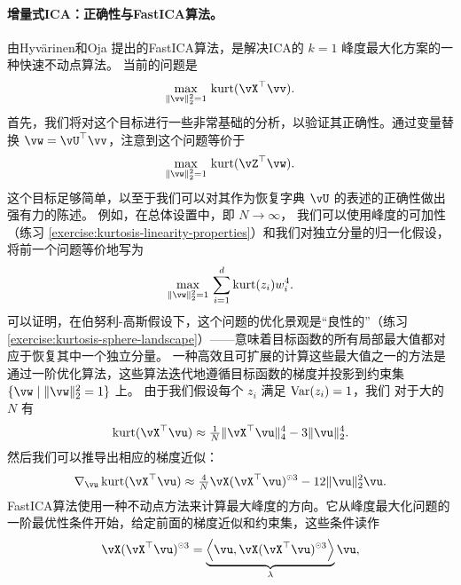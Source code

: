 \documentclass[../../book-main_zh.tex]{subfiles}
\begin{document}
\paragraph{增量式ICA：正确性与FastICA算法。}
由Hyv\"{a}rinen和Oja \cite{hyvarinen-1997} 提出的FastICA算法，是解决ICA的 $k=1$ 峰度最大化方案的一种快速不动点算法。
当前的问题是
\begin{equation}\label{eq:kurtosis-maximization-sphere-finitesample}
    \max_{\norm{\vv}_2^2 = 1}\, \kurt(\vX^\top \vv).
\end{equation}
首先，我们将对这个目标进行一些非常基础的分析，以验证其正确性。通过变量替换 $\vw = \vU^\top \vv$，注意到这个问题等价于
\begin{equation*}
    \max_{\norm{\vw}_2^2 = 1}\, 
    \mathrm{kurt}(\vZ^\top \vw).
\end{equation*}
这个目标足够简单，以至于我们可以对其作为恢复字典 $\vU$ 的表述的正确性做出强有力的陈述。
例如，在总体设置中，即 $N \to \infty$，
我们可以使用峰度的可加性（练习 \ref{exercise:kurtosis-linearity-properties}）和我们对独立分量的归一化假设，将前一个问题等价地写为
\begin{equation}\label{eq:kurtosis-maximization-sphere-population-simple}
    \max_{\norm{\vw}_2^2 = 1}\, 
    \sum_{i=1}^d \mathrm{kurt}(z_i) w_i^4.
\end{equation}
可以证明，在伯努利-高斯假设下，这个问题的优化景观是“良性的”（练习 \ref{exercise:kurtosis-sphere-landscape}）——意味着目标函数的所有局部最大值都对应于恢复其中一个独立分量。
一种高效且可扩展的计算这些最大值之一的方法是通过一阶优化算法，这些算法迭代地遵循目标函数的梯度并投影到约束集 $\set{\vw \given \norm{\vw}_2^2 = 1}$ 上。
由于我们假设每个 $z_i$ 满足 $\operatorname{Var}(z_i)=1$，我们
对于大的 $N$ 有
\begin{equation}\label{eq:kurtosis-approximation-l4}
    \kurt(\vX^\top \vu)
    \approx
    \tfrac{1}{N} \norm{\vX^\top \vu}_4^4 - 3 \norm{\vu}_2^4.
\end{equation}
然后我们可以推导出相应的梯度近似：
\begin{equation*}
    \nabla_{\vu} \kurt(\vX^\top \vu)
    \approx
    \tfrac{4}{N} \vX (\vX^\top \vu)^{\hada 3}
    - 12 \norm{\vu}_2^2 \vu.
\end{equation*}
FastICA算法使用一种不动点方法来计算最大峰度的方向。它从峰度最大化问题的一阶最优性条件开始，给定前面的梯度近似和约束集，这些条件读作
\begin{align}\label{eq:kurtosis-max-sphere-stationarity}
   \vX (\vX^\top \vu)^{\hada 3} 
   = 
   \underbrace{
   \ip*{\vu}{
   \vX (\vX^\top \vu)^{\hada 3} 
   }}_{\lambda} \vu,
\end{align}
\end{document}
